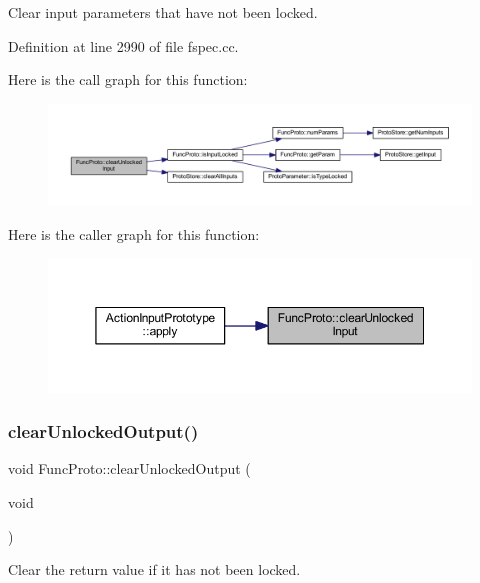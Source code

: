 Clear input parameters that have not been locked. 



Definition at line 2990 of file fspec.\+cc.

Here is the call graph for this function\+:
\nopagebreak
\begin{figure}[H]
\begin{center}
\leavevmode
\includegraphics[width=350pt]{class_func_proto_ae91eb49088323b42bdb38b83586eea6f_cgraph}
\end{center}
\end{figure}
Here is the caller graph for this function\+:
\nopagebreak
\begin{figure}[H]
\begin{center}
\leavevmode
\includegraphics[width=350pt]{class_func_proto_ae91eb49088323b42bdb38b83586eea6f_icgraph}
\end{center}
\end{figure}
\mbox{\label{class_func_proto_a3c7428f70c6c7e040b4d090f3efeee08}} 
\subsubsection{\texorpdfstring{clearUnlockedOutput()}{clearUnlockedOutput()}}
{\footnotesize\ttfamily void Func\+Proto\+::clear\+Unlocked\+Output (\begin{DoxyParamCaption}\item[{void}]{ }\end{DoxyParamCaption})}



Clear the return value if it has not been locked. 



